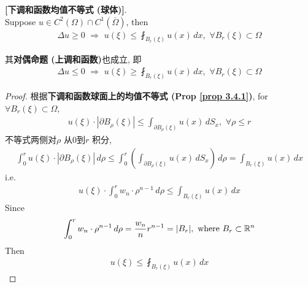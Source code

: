 	\begin{corollary}\label{cor 3.4.1}
		\textbf{[下调和函数均值不等式 (球体)]}. \\
		Suppose $u \in C^2(\Omega) \cap C^1 \left( \overline{\Omega} \right)$, then
		\begin{align*}
			\Delta u \geq 0 \,\, \Rightarrow \,\, u(\xi) \leq \fint_{B_{r}(\xi)} u(x) \, dx , \,\, \forall B_{r}(\xi) \subset \Omega
		\end{align*}
		
		\vspace{4em}
		
		\begin{rmk}
			其\textbf{对偶命题 (上调和函数)}也成立, 即
			\begin{align*}
				\Delta u \leq 0 \,\, \Rightarrow \,\, u(\xi) \geq \fint_{B_{r}(\xi)} u(x) \, dx , \,\, \forall B_{r}(\xi) \subset \Omega
			\end{align*}
		\end{rmk}
		
		\vspace{6em}
		
		\begin{proof}
			根据\textbf{下调和函数球面上的均值不等式 (Prop \ref{prop 3.4.1})}, for $\forall B_{r}(\xi) \subset \Omega$, 
			\begin{align*}
				u(\xi) \cdot \left| \partial B_{\rho}(\xi) \right| 
				\leq \int_{\partial B_{\rho}(\xi)} u(x) \, dS_x , \,\, \forall \rho \leq r
			\end{align*}
			不等式两侧对$\rho$ 从0到$r$ 积分, 
			\begin{align*}
				\int_{0}^r u(\xi) \cdot \left| \partial B_{\rho}(\xi) \right| \, d\rho 
				\leq \int_{0}^r \left( \int_{\partial B_{\rho}(\xi)} u(x) \, dS_x \right) \, d\rho 
				= \int_{B_{r}(\xi)} u(x) \, dx
			\end{align*}
			i.e.
			\begin{align*}
				u(\xi) \cdot \int_{0}^r w_n \cdot \rho^{n - 1} \, d\rho 
				\leq \int_{B_{r}(\xi)} u(x) \, dx
			\end{align*}
			Since 
			\begin{align*}
				\int_{0}^r w_n \cdot \rho^{n - 1} \, d\rho 
				= \frac{w_n}{n} r^{n - 1} 
				= | B_r | , \,\, \text{where} \,\, B_{r} \subset \mathbb{R}^n
			\end{align*}
			Then
			\begin{align}
				u(\xi) \leq \fint_{B_{r}(\xi)} u(x) \, dx
			\end{align}
		\end{proof}
	\end{corollary}

